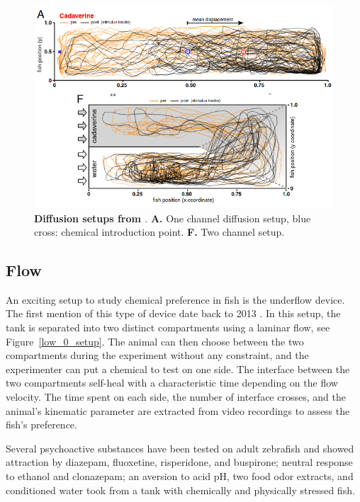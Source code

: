     \begin{figure}[h]
      \centering
      \includegraphics[width=1\textwidth]{part_2/assets/diffusion.png}
      \caption{\textbf{Diffusion setups from \cite{hussain2013high}}. \textbf{A.} One channel diffusion setup, blue cross: chemical introduction point. \textbf{F.} Two channel setup.}
      \label{diffusion_setup}
    \end{figure}

    \subsection{Flow}
    An exciting setup to study chemical preference in fish is the underflow device. The first mention of this type of device date back to 2013 \cite{readman2013fish}. In this setup, the tank is separated into two distinct compartments using a laminar flow, see Figure~\ref{low_0_setup}. The animal can then choose between the two compartments during the experiment without any constraint, and the experimenter can put a chemical to test on one side. The interface between the two compartments self-heal with a characteristic time depending on the flow velocity. The time spent on each side, the number of interface crosses, and the animal's kinematic parameter are extracted from video recordings to assess the fish's preference.

    Several psychoactive substances have been tested on adult zebrafish \cite{abreu2016acute, abreu2016behavioral} and showed attraction by diazepam, fluoxetine, risperidone, and buspirone; neutral response to ethanol and clonazepam; an aversion to acid pH, two food odor extracts, and conditioned water took from a tank with chemically and physically stressed fish.


